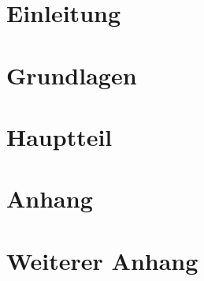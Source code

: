 \documentclass[12pt]{report}
\begin{document}

\newpage


\begin{abstract}
    
\end{abstract}


\tableofcontents
\newpage


{}
\listoffigures
\newpage


\chapter{Einleitung}

\newpage


\chapter{Grundlagen}

\newpage


\chapter{Hauptteil}

\newpage


\appendix
\chapter{Anhang}

\newpage

\chapter{Weiterer Anhang}

\newpage


{}


\newpage
\end{document}
